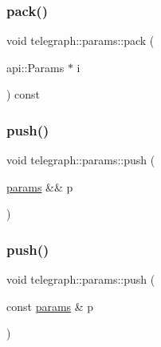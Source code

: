 \mbox{\label{classtelegraph_1_1params_ad07afe221473ae0ffb0ddcf29232d553}} 
\subsubsection{\texorpdfstring{pack()}{pack()}}
{\footnotesize\ttfamily void telegraph\+::params\+::pack (\begin{DoxyParamCaption}\item[{api\+::\+Params $\ast$}]{i }\end{DoxyParamCaption}) const}

\mbox{\label{classtelegraph_1_1params_a738dbb2008fe561a64b6880bd1c5f0fc}} 
\subsubsection{\texorpdfstring{push()}{push()}\hspace{0.1cm}{\footnotesize\ttfamily [1/3]}}
{\footnotesize\ttfamily void telegraph\+::params\+::push (\begin{DoxyParamCaption}\item[{\hyperlink{classtelegraph_1_1params}{params} \&\&}]{p }\end{DoxyParamCaption})\hspace{0.3cm}{\ttfamily [inline]}}

\mbox{\label{classtelegraph_1_1params_a8d7b23780508e6ccb37fabc3fc24ed88}} 
\subsubsection{\texorpdfstring{push()}{push()}\hspace{0.1cm}{\footnotesize\ttfamily [2/3]}}
{\footnotesize\ttfamily void telegraph\+::params\+::push (\begin{DoxyParamCaption}\item[{const \hyperlink{classtelegraph_1_1params}{params} \&}]{p }\end{DoxyParamCaption})\hspace{0.3cm}{\ttfamily [inline]}}

